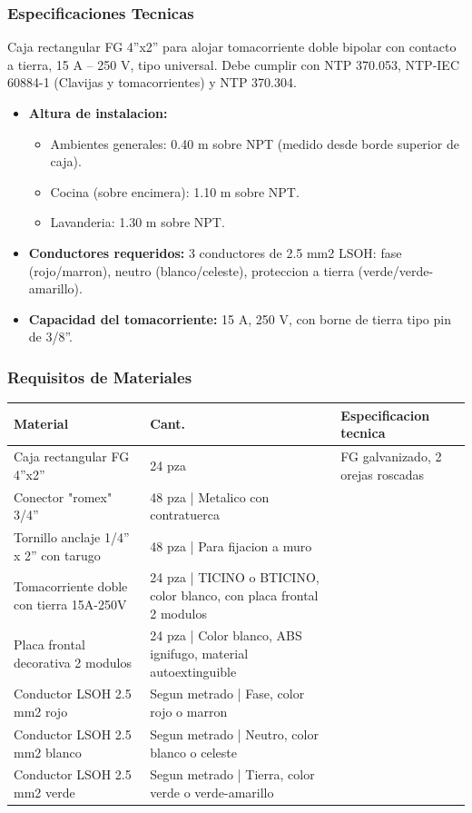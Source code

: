 \subsubsection{Especificaciones Tecnicas}

Caja rectangular FG 4''x2'' para alojar tomacorriente doble bipolar con contacto a tierra, 15 A -- 250 V, tipo universal. Debe cumplir con NTP 370.053, NTP-IEC 60884-1 (Clavijas y tomacorrientes) y NTP 370.304.

\begin{itemize}[nosep]
  \item \textbf{Altura de instalacion:}
  \begin{itemize}
    \item Ambientes generales: 0.40 m sobre NPT (medido desde borde superior de caja).
    \item Cocina (sobre encimera): 1.10 m sobre NPT.
    \item Lavanderia: 1.30 m sobre NPT.
  \end{itemize}
  \item \textbf{Conductores requeridos:} 3 conductores de 2.5 mm2 LSOH: fase (rojo/marron), neutro (blanco/celeste), proteccion a tierra (verde/verde-amarillo).
  \item \textbf{Capacidad del tomacorriente:} 15 A, 250 V, con borne de tierra tipo pin de 3/8''.
\end{itemize}

\subsubsection{Requisitos de Materiales}

\begin{longtable}{L{5.0cm} L{2.0cm} L{7.5cm}}
\toprule
\textbf{Material} & \textbf{Cant.} & \textbf{Especificacion tecnica} \\
\midrule
Caja rectangular FG 4''x2'' & 24 pza & FG galvanizado, 2 orejas roscadas \\
Conector "romex" 3/4'' & 48 pza | Metalico con contratuerca \\
Tornillo anclaje 1/4'' x 2'' con tarugo & 48 pza | Para fijacion a muro \\
Tomacorriente doble con tierra 15A-250V & 24 pza | TICINO o BTICINO, color blanco, con placa frontal 2 modulos \\
Placa frontal decorativa 2 modulos & 24 pza | Color blanco, ABS ignifugo, material autoextinguible \\
Conductor LSOH 2.5 mm2 rojo & Segun metrado | Fase, color rojo o marron \\
Conductor LSOH 2.5 mm2 blanco & Segun metrado | Neutro, color blanco o celeste \\
Conductor LSOH 2.5 mm2 verde & Segun metrado | Tierra, color verde o verde-amarillo \\
\bottomrule
\end{longtable}

